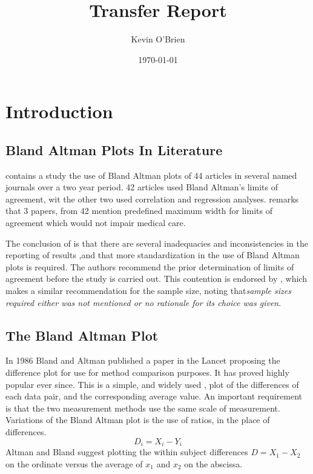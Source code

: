 \documentclass[12pt, a4paper]{report}
\begin{document}
\author{Kevin O'Brien}
\title{Transfer Report}
\date{\today}
\maketitle

\tableofcontents \setcounter{tocdepth}{2}

\newpage
\chapter{Introduction}
\section{Bland Altman Plots In Literature}
\citet{mantha} contains a study the use of Bland Altman plots of 44 articles in several named journals over a two year period. 42
articles used Bland Altman's limits of agreement, wit the other two used correlation and regression analyses. \citet{mantha}
remarks that 3 papers, from 42 mention predefined maximum width for limits of agreement which would not impair medical care.

The conclusion of \citet{mantha} is that there are several inadequacies and inconsistencies in the reporting of results ,and
that more standardization in the use of Bland Altman plots is required. The authors recommend the prior determination of limits
of agreement before the study is carried out. This contention is endorsed by \citet{lin}, which makes a similar recommendation for
the sample size, noting that\emph{sample sizes required either was not mentioned or no rationale for its choice was given}.
\section{The Bland Altman Plot}

In 1986 Bland and Altman published a paper in the Lancet proposing the difference plot for use for method comparison purposes. It has
proved highly popular ever since. This is a simple, and widely used , plot of the differences of each data pair, and the
corresponding average value. An important requirement is that the two measurement methods use the same scale of measurement.
\\
Variations of the Bland Altman plot is the use of ratios, in the place of differences.
\begin{equation}
D_{i} = X_{i} - Y_{i}   \label{BA01}
\end{equation}
Altman and Bland suggest plotting the within subject differences $ D = X_{1} - X_{2} $ on the ordinate versus the average of $x_{1}$
and  $x_{2}$ on the abscissa. 
\end{document}
